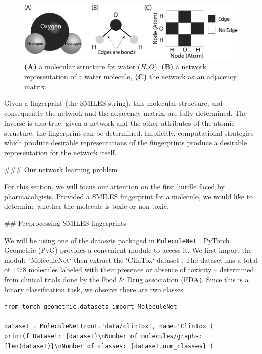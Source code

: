 \begin{figure}
    \centering
    \includegraphics[width=\linewidth]{next/Images/water_molecule.png}
    \caption{\textbf{(A)} a molecular structure for water ($H_2 O$), \textbf{(B)} a network representation of a water molecule, \textbf{(C)} the network as an adjacency matrix.}
    \label{fig:next:molecule}
\end{figure}

Given a fingerprint (the SMILES string), this molecular structure, and consequently the network and the adjacency matrix, are fully determined. The inverse is also true: given a network and the other attributes of the atomic structure, the fingerprint can be determined. Implicitly, computational strategies which produce desirable representations of the fingerprints produce a desirable representation for the network itself.


### Our network learning problem

For this section, we will focus our attention on the first hurdle faced by pharmacoligists. Provided a SMILES fingerprint for a molecule, we would like to determine whether the molecule is toxic or non-toxic.

## Preprocessing SMILES fingerprints

We will be using one of the datasets packaged in \texttt{MoleculeNet} \cite{moleculenet}. PyTorch Geometric (PyG) \cite{pytorchgeom,pytorch} provides a convenient module to access it. We first import the module `MoleculeNet` then extract the `ClinTox` dataset \cite{Novick2013Nov}. The dataset has a total of $1478$ molecules labeled with their presence or absence of toxicity -- determined from clinical trials done by the Food & Drug association (FDA). Since this is a binary classification task, we observe there are two classes.

\begin{lstlisting}[style=python]
from torch_geometric.datasets import MoleculeNet

dataset = MoleculeNet(root='data/clintox', name='ClinTox')
print(f'Dataset: {dataset}\nNumber of molecules/graphs: {len(dataset)}\nNumber of classes: {dataset.num_classes}')
\end{lstlisting}


